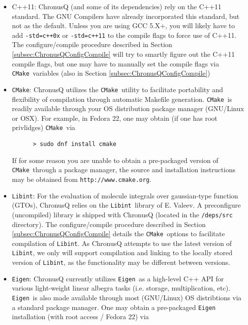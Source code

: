 \documentclass[12pt]{article}
\newcommand{\CMake}{\texttt{CMake}}
\newcommand{\Libint}{\texttt{Libint}}
\newcommand{\Eigen}{\texttt{Eigen}}
\begin{document}
    
    \begin{itemize}
      \item C++11: ChronusQ (and some of its dependencies) rely on the C++11 
        standard. The GNU Compilers have already incorporated this standard, but
	not as the default. Unless you are using GCC 5.X+, you will likely have
	to add \texttt{-std=c++0x} or \texttt{-std=c++11} to the compile flags
	to force use of C++11. The configure/compile procedure described in
	Section \ref{subsec:ChronusQConfigCompile} will try to smartly figure out
	the C++11 compile flags, but one may have to manually set the compile flags
	via \CMake~variables (also in Section \ref{subsec:ChronusQConfigCompile})

      \item \CMake: ChronusQ utilizes the \CMake~utility to facilitate
        portability and flexibility of compilation through automatic Makefile 
	generation. \CMake~is readily available through your OS distribution
	package manager (GNU/Linux or OSX). For example, in Fedora 22, one may 
	obtain (if one has root privlidges) \CMake~via

	\begin{lstlisting}
	  > sudo dnf install cmake
	\end{lstlisting}
	If for some reason you are unable to obtain a pre-packaged version of 
	\CMake~through a package manager, the source and installation
	instructions may be obtained from \texttt{http://www.cmake.org}.

      \item \Libint: For the evaluation of molecule integrals over gaussian-type
        function (GTOs), ChronusQ relies on the \Libint~library of E. Valeev. A
	preconfigure (uncompiled) library is shipped with ChronusQ (located in
	the \texttt{/deps/src} directory). The configure/compile procedure
	described in Section \ref{subsec:ChronusQConfigCompile} details the
	\CMake~options to facilitate compilation of \Libint. As ChronusQ attempts
	to use the latest version of \Libint, we only will support compilation
	and linking to the locally stored version of \Libint, as the functionality
	may be different between versions.

      \item \Eigen: ChronusQ currently utilizes \Eigen~as a high-level C++ API for
        various light-weight linear albegra tasks (i.e. storage, multiplication,
	etc). \Eigen~is also made available through most (GNU/Linux) OS distribtions
	via a standard package manager. One may obtain a pre-packaged \Eigen~
	installation (with root access / Fedora 22) via


\end{itemize}
\end{document}

